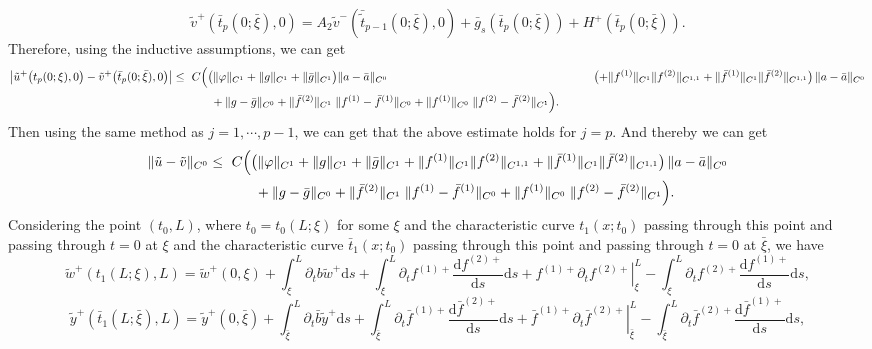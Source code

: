 \documentclass[a4paper,reqno,11pt]{amsart}
\numberwithin{equation}{section} %
\begin{document}
$$
\tilde{v}^{+}\left( \bar{t}_p\left( 0;\bar{\xi} \right) ,0 \right) =A_2\tilde{v}^-\left( \bar{\tilde{t} }_{p-1}\left( 0;\bar{\xi} \right) ,0 \right) +\bar{g}_s\left( \bar{t}_p(0;\bar{\xi}) \right) +H^+\left( \bar{t}_p(0;\bar{\xi}) \right) .
$$
Therefore, using the inductive assumptions, we can get 
$$
\begin{aligned}
\bigl\lvert \tilde u^+\bigl(t_p(0;\xi),0\bigr)- \tilde{v}^{+}\bigl(\bar t_p(0;\bar\xi),0\bigr)\bigr\rvert
\le{}&\ C\Bigl(
  \bigl(\|\varphi\|_{C^{1}}+\|g\|_{C^{1}}+\|\bar g\|_{C^{1}}\bigr) \|a-\bar a\|_{C^{0}} \Bigr.
&\qquad   \bigl(+ \|f^{(1)}\|_{C^{1}}\|f^{(2)}\|_{C^{1,1}}
   + \|\bar f^{(1)}\|_{C^{1}}\|\bar f^{(2)}\|_{C^{1,1}}\bigr)\,
   \|a-\bar a\|_{C^{0}}\\
&\qquad + \Bigl. \|g-\bar g\|_{C^{0}}
  + \|\bar f^{(2)}\|_{C^{1}}\;\|f^{(1)}-\bar f^{(1)}\|_{C^{0}}
  + \|f^{(1)}\|_{C^{0}}\;\|f^{(2)}-\bar f^{(2)}\|_{C^{1}}
\Bigr).
\end{aligned}
$$
Then using the same method as $j=1,\cdots,p-1$, we can get that the above estimate holds for $j=p$. And thereby we can get
$$
\begin{aligned}
\|\tilde u-\tilde v\|_{C^{0}}
\le{}&\ C\Bigl(
  \bigl(\|\varphi\|_{C^{1}}+\|g\|_{C^{1}}+\|\bar g\|_{C^{1}}
  + \|f^{(1)}\|_{C^{1}}\|f^{(2)}\|_{C^{1,1}}
  + \|\bar f^{(1)}\|_{C^{1}}\|\bar f^{(2)}\|_{C^{1,1}}\bigr)\,
  \|a-\bar a\|_{C^{0}} \\
&\qquad + \|g-\bar g\|_{C^{0}}
  + \|\bar f^{(2)}\|_{C^{1}}\;\|f^{(1)}-\bar f^{(1)}\|_{C^{0}}
  + \|f^{(1)}\|_{C^{0}}\;\|f^{(2)}-\bar f^{(2)}\|_{C^{1}}
\Bigr).
\end{aligned}
$$
Considering the point $(t_0,L)$, where $t_0=t_0(L;\xi)$ for some $\xi$ and the characteristic curve $t_1(x;t_0)$ passing through this point and passing through $t=0$ at $\xi$ and the characteristic curve $\bar{t}_1(x;t_0)$ passing through this point and passing through $t=0$ at $\bar{\xi}$, we have
$$
\tilde{w}^+\left( t_1(L;\xi ),L \right) =\tilde{w}^+(0,\xi )+\int_{\xi}^L{\partial _tb\tilde{w}^+\mathrm{d}s}+\int_{\xi}^L{\partial _tf^{(1)+}\frac{\mathrm{d}f^{(2)+}}{\mathrm{d}s}\mathrm{d}s}+\left. f^{(1)+}\partial _tf^{(2)+} \right|_{\xi}^{L}-\int_{\xi}^L{\partial _tf^{(2)+}\frac{\mathrm{d}f^{(1)+}}{\mathrm{d}s}\mathrm{d}s,}
$$
$$
\tilde{y}^+\left( \bar{t}_1(L;\bar{\xi}),L \right) =\tilde{y}^+(0,\bar{\xi})+\int_{\bar{\xi}}^L{\partial _t\bar{b}\tilde{y}^+\mathrm{d}s}+\int_{\bar{\xi}}^L{\partial _t\bar{f}^{(1)+}\frac{\mathrm{d}\bar{f}^{(2)+}}{\mathrm{d}s}\mathrm{d}s}+\left. \bar{f}^{(1)+}\partial _t\bar{f}^{(2)+} \right|_{\bar{\xi}}^{L}-\int_{\bar{\xi}}^L{\partial _t\bar{f}^{(2)+}\frac{\mathrm{d}\bar{f}^{(1)+}}{\mathrm{d}s}\mathrm{d}s,}
$$
\end{document}
